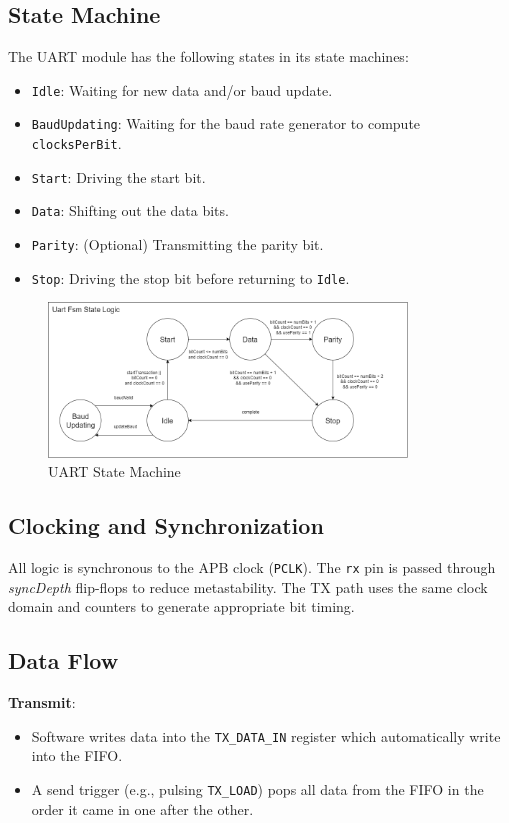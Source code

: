 \subsection{State Machine}
The UART module has the following states in its state machines:
\begin{itemize}
    \item \texttt{Idle}: Waiting for new data and/or baud update.
    \item \texttt{BaudUpdating}: Waiting for the baud rate generator to compute \texttt{clocksPerBit}.
    \item \texttt{Start}: Driving the start bit.
    \item \texttt{Data}: Shifting out the data bits.
    \item \texttt{Parity}: (Optional) Transmitting the parity bit.
    \item \texttt{Stop}: Driving the stop bit before returning to \texttt{Idle}.
\end{itemize}

\begin{figure}[H]
  \centering
  \includegraphics[width=0.85\textwidth]{images/uartfsm.drawio.png}
  \caption{UART State Machine}
  \label{fig:uartfsm}
\end{figure}

\subsection{Clocking and Synchronization}
All logic is synchronous to the APB clock (\texttt{PCLK}). The \texttt{rx} pin is passed through \textit{syncDepth} flip-flops to reduce metastability. The TX path uses the same clock domain and counters to generate appropriate bit timing.

\subsection{Data Flow}
\textbf{Transmit}:
\begin{itemize}
    \item Software writes data into the \texttt{TX\_DATA\_IN} register which automatically write into the FIFO.
    \item A send trigger (e.g., pulsing \texttt{TX\_LOAD}) pops all data from the FIFO in the order it came in one after the other.
\end{itemize}

